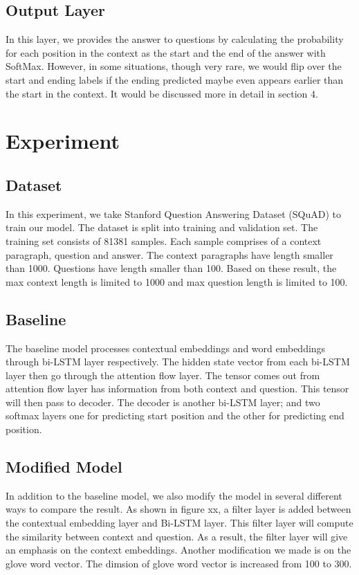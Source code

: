 \documentclass{article} %
\begin{document}
\subsection{Output Layer}

In this layer, we provides the answer to questions by calculating the probability for each position in the context as the start and the end of the answer with SoftMax. However, in some situations, though very rare, we would flip over the start and ending labels if the ending predicted maybe even appears earlier than the start in the context. It would be discussed more in detail in section 4.

\section{Experiment}
\subsection{Dataset}
In this experiment, we take Stanford Question Answering Dataset (SQuAD) to train our model.
The dataset is split into training and validation set. The training set consists of 81381 samples.
Each sample comprises of a context paragraph, question and answer.
The context paragraphs have length smaller than 1000. Questions have length smaller than 100.
Based on these result, the max context length is limited to 1000 and max question length is limited to 100.

\subsection{Baseline}
The baseline model processes contextual embeddings and word embeddings through bi-LSTM layer respectively.
The hidden state vector from each bi-LSTM layer then go through the attention flow layer.
The tensor comes out from attention flow layer has information from both context and question.
This tensor will then pass to decoder. The decoder is another bi-LSTM layer; and two softmax layers one for predicting start position and the other for predicting end position.

\subsection{Modified Model}
In addition to the baseline model, we also modify the model in several different ways to compare the result.
As shown in figure xx, a filter layer is added between the contextual embedding layer and Bi-LSTM layer.
This filter layer will compute the similarity between context and question. As a result, the filter layer will give an emphasis on the context embeddings.
Another modification we made is on the glove word vector. The dimsion of glove word vector is increased from 100 to 300.
\end{document}
